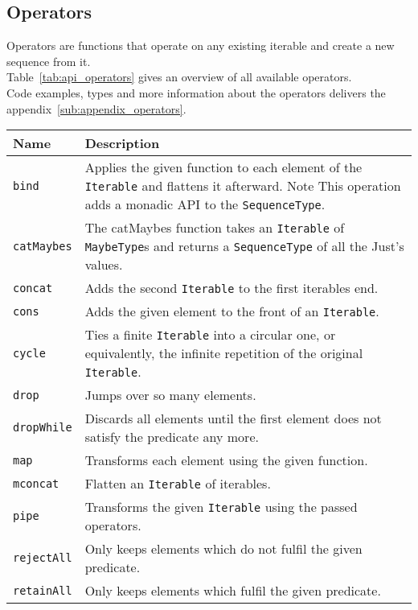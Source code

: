 \subsection{Operators} %
\label{sub:api_Operators}
Operators are functions that operate on any existing iterable and create a
new sequence from it. \\
Table~\ref{tab:api_operators} gives an overview of all available operators.\\
Code examples, types and more information about the operators delivers the
appendix~\ref{sub:appendix_operators}.
\begin{table}[H]
  \centering
  \begin{tabularx}{\textwidth}{| l | X |} \hline
    \textbf{Name} & \textbf{Description} \\ \hline
    \texttt{bind} & Applies the given function to each element of the \texttt{Iterable} and flattens it afterward. Note This operation adds a monadic API to the \texttt{SequenceType}. \\ \hline 
    \texttt{catMaybes} & The catMaybes function takes an \texttt{Iterable} of \texttt{MaybeType}s and returns a \texttt{SequenceType} of all the Just's values. \\ \hline 
    \texttt{concat} & Adds the second \texttt{Iterable} to the first iterables end. \\ \hline 
    \texttt{cons} & Adds the given element to the front of an \texttt{Iterable}. \\ \hline 
    \texttt{cycle} & Ties a finite \texttt{Iterable} into a circular one, or equivalently, the infinite repetition of the original \texttt{Iterable}. \\ \hline 
    \texttt{drop} & Jumps over so many elements. \\ \hline 
    \texttt{dropWhile} & Discards all elements until the first element does not satisfy the predicate any more. \\ \hline 
    \texttt{map} & Transforms each element using the given function. \\ \hline 
    \texttt{mconcat} & Flatten an \texttt{Iterable} of iterables. \\ \hline 
    \texttt{pipe} & Transforms the given \texttt{Iterable} using the passed operators. \\ \hline 
    \texttt{rejectAll} & Only keeps elements which do not fulfil the given predicate. \\ \hline 
    \texttt{retainAll} & Only keeps elements which fulfil the given predicate. \\ \hline 

\end{tabularx}
\end{table}
